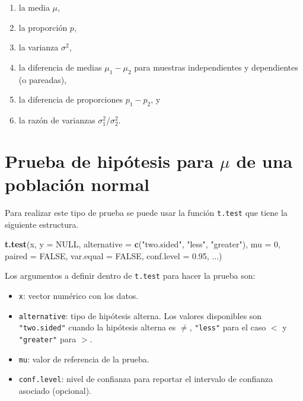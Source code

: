 \documentclass[10pt,]{krantz}
\makeatletter
\newenvironment{Shaded}{\begin{snugshade}}{\end{snugshade}}
\newcommand{\KeywordTok}[1]{\textcolor[rgb]{0.13,0.29,0.53}{\textbf{#1}}}
\newcommand{\DataTypeTok}[1]{\textcolor[rgb]{0.13,0.29,0.53}{#1}}
\newcommand{\DecValTok}[1]{\textcolor[rgb]{0.00,0.00,0.81}{#1}}
\newcommand{\FloatTok}[1]{\textcolor[rgb]{0.00,0.00,0.81}{#1}}
\newcommand{\StringTok}[1]{\textcolor[rgb]{0.31,0.60,0.02}{#1}}
\newcommand{\OtherTok}[1]{\textcolor[rgb]{0.56,0.35,0.01}{#1}}
\newcommand{\NormalTok}[1]{#1}
\providecommand{\tightlist}{%
  \setlength{\itemsep}{0pt}\setlength{\parskip}{0pt}}
\newenvironment{kframe}{%
\medskip{}
\setlength{\fboxsep}{.8em}
 \def\at@end@of@kframe{}%
 \ifinner\ifhmode%
  \def\at@end@of@kframe{\end{minipage}}%
  \begin{minipage}{\columnwidth}%
 \fi\fi%
 \def\FrameCommand##1{\hskip\@totalleftmargin \hskip-\fboxsep
 \colorbox{shadecolor}{##1}\hskip-\fboxsep
     \hskip-\linewidth \hskip-\@totalleftmargin \hskip\columnwidth}%
 \MakeFramed {\advance\hsize-\width
   \@totalleftmargin\z@ \linewidth\hsize
   \@setminipage}}%
 {\par\unskip\endMakeFramed%
 \at@end@of@kframe}
\renewenvironment{Shaded}{\begin{kframe}}{\end{kframe}}
\makeatother
\begin{document}
\begin{enumerate}
\def\labelenumi{\arabic{enumi}.}
\tightlist
\item
  la media \(\mu\),
\item
  la proporción \(p\),
\item
  la varianza \(\sigma^2\),
\item
  la diferencia de medias \(\mu_1-\mu_2\) para muestras independientes y
  dependientes (o pareadas),
\item
  la diferencia de proporciones \(p_1 - p_2\), y
\item
  la razón de varianzas \(\sigma_1^2 / \sigma_2^2\).
\end{enumerate}

\section{\texorpdfstring{Prueba de hipótesis para \(\mu\) de una
población
normal}{Prueba de hipótesis para \textbackslash{}mu de una población normal}}\label{prueba-de-hipotesis-para-mu-de-una-poblacion-normal}

Para realizar este tipo de prueba se puede usar la función
\texttt{t.test} que tiene la siguiente estructura.

\begin{Shaded}
\begin{Highlighting}[]
\KeywordTok{t.test}\NormalTok{(x, }\DataTypeTok{y =} \OtherTok{NULL}\NormalTok{,}
       \DataTypeTok{alternative =} \KeywordTok{c}\NormalTok{(}\StringTok{"two.sided"}\NormalTok{, }\StringTok{"less"}\NormalTok{, }\StringTok{"greater"}\NormalTok{),}
       \DataTypeTok{mu =} \DecValTok{0}\NormalTok{, }\DataTypeTok{paired =} \OtherTok{FALSE}\NormalTok{, }\DataTypeTok{var.equal =} \OtherTok{FALSE}\NormalTok{,}
       \DataTypeTok{conf.level =} \FloatTok{0.95}\NormalTok{, ...)}
\end{Highlighting}
\end{Shaded}

Los argumentos a definir dentro de \texttt{t.test} para hacer la prueba
son:

\begin{itemize}
\tightlist
\item
  \texttt{x}: vector numérico con los datos.
\item
  \texttt{alternative}: tipo de hipótesis alterna. Los valores
  disponibles son \texttt{"two.sided"} cuando la hipótesis alterna es
  \(\neq\), \texttt{"less"} para el caso \(<\) y \texttt{"greater"} para
  \(>\).
\item
  \texttt{mu}: valor de referencia de la prueba.
\item
  \texttt{conf.level}: nivel de confianza para reportar el intervalo de
  confianza asociado (opcional).
\end{itemize}
\end{document}
